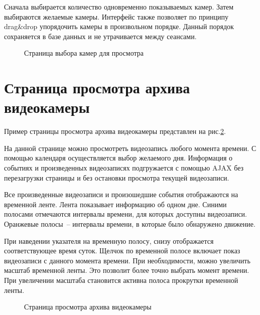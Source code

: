 Сначала выбирается количество одновременно показываемых камер.
Затем выбираются желаемые камеры.
Интерфейс также позволяет по принципу drag\&drop упорядочить камеры в
произвольном порядке. Данный порядок сохраняется в базе данных и не
утрачивается между сеансами.

\begin{figure}[!htb]
\def\svgwidth{\columnwidth}
\caption{Страница выбора камер для просмотра}
\label{ui_2}
\end{figure}

\section{Страница просмотра архива видеокамеры}
Пример страницы просмотра архива видеокамеры представлен на рис.\ref{ui_3}.

На данной странице можно просмотреть видеозапись любого момента времени.
С помощью календаря осуществляется выбор желаемого дня. Информация о событиях и произведенных
видеозаписях подгружается с помощью AJAX без перезагрузки страницы и без остановки просмотра
текущей видеозаписи.

Все произведенные видеозаписи и произошедшие события отображаются на временной ленте.
Лента показывает информацию об одном дне. Синими полосами отмечаются интервалы времени,
для которых доступны видеозаписи. Оранжевые полосы~-- интервалы времени, в которые было обнаружено
движение.

При наведении указателя на временную полосу, снизу отображается соответствующее время суток.
Щелчок по временной полосе включает показ видеозаписи с данного момента времени.
При необходимости, можно увеличить масштаб временной ленты.
Это позволит более точно выбрать момент времени.
При увеличении масштаба становится активна полоса прокрутки временной ленты.

\begin{figure}[!htb]
\def\svgwidth{\columnwidth}
\caption{Страница просмотра архива видеокамеры}
\label{ui_3}
\end{figure}
